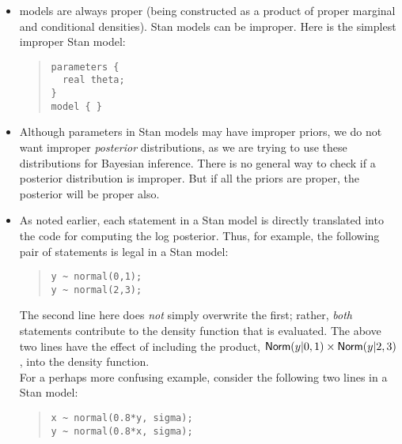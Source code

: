 \begin{itemize}
\item \BUGS models are always proper (being constructed as a product
  of proper marginal and conditional densities).  Stan models can be
  improper.  Here is the simplest improper Stan model: 
\begin{quote}
\begin{Verbatim}
parameters {
  real theta;
} 
model { }
\end{Verbatim}
\end{quote}
\item Although parameters in Stan models may have improper priors, we
  do not want improper \emph{posterior} distributions, as we are trying to
  use these distributions for Bayesian inference.  There is no general
  way to check if a posterior distribution is improper.  But if all
  the priors are proper, the posterior will be proper also.
\item
  As noted earlier, each statement in a Stan model is directly translated into the \Cpp code for computing the log posterior.  Thus, for example, the following pair of statements is legal in a Stan model:
\begin{quote}
\begin{Verbatim}
y ~ normal(0,1);
y ~ normal(2,3);
\end{Verbatim}
\end{quote}
%
The second line here does \emph{not} simply overwrite the first;
rather, \emph{both} statements contribute to the density function that
is evaluated.  The above two lines have the effect of including the
product, $\mbox{\sf Norm}(y|0,1) \times \mbox{\sf Norm}(y|2,3)$, into the
density function.
\\[6pt] 
For a perhaps more confusing example, consider the following two lines in a Stan model:
\begin{quote}
\begin{Verbatim}
x ~ normal(0.8*y, sigma);
y ~ normal(0.8*x, sigma);

\end{Verbatim}
\end{quote}
\end{itemize}

